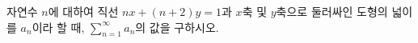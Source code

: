 자연수 $n$에 대하여 직선 $nx+(n+2)y=1$과 $x$축 및 \mbox{$y$축}으로 둘러싸인 도형의 넓이를 $a_n$이라 할 때, $\displaystyle\sum_{n=1}^{\infty} a_n$의 값을 구하시오.
